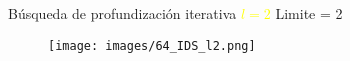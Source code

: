     \begin{frame}{Búsqueda de profundización iterativa \textcolor{Yellow}{$l=2$}}
        Limite = 2
        \begin{figure}\texttt{[image: images/64\_IDS\_l2.png]}\end{figure}
    \end{frame}
